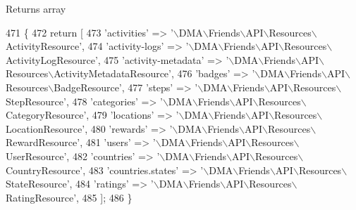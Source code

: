 \begin{DoxyReturn}{Returns}
array 
\end{DoxyReturn}

\begin{DoxyCode}
471     \{
472         \textcolor{keywordflow}{return} [
473             \textcolor{stringliteral}{'activities'}            => \textcolor{stringliteral}{'\(\backslash\)DMA\(\backslash\)Friends\(\backslash\)API\(\backslash\)Resources\(\backslash\)ActivityResource'},
474             \textcolor{stringliteral}{'activity-logs'}         => \textcolor{stringliteral}{'\(\backslash\)DMA\(\backslash\)Friends\(\backslash\)API\(\backslash\)Resources\(\backslash\)ActivityLogResource'},
475             \textcolor{stringliteral}{'activity-metadata'}     => \textcolor{stringliteral}{'\(\backslash\)DMA\(\backslash\)Friends\(\backslash\)API\(\backslash\)Resources\(\backslash\)ActivityMetadataResource'},
476             \textcolor{stringliteral}{'badges'}                => \textcolor{stringliteral}{'\(\backslash\)DMA\(\backslash\)Friends\(\backslash\)API\(\backslash\)Resources\(\backslash\)BadgeResource'},
477             \textcolor{stringliteral}{'steps'}                 => \textcolor{stringliteral}{'\(\backslash\)DMA\(\backslash\)Friends\(\backslash\)API\(\backslash\)Resources\(\backslash\)StepResource'},
478             \textcolor{stringliteral}{'categories'}            => \textcolor{stringliteral}{'\(\backslash\)DMA\(\backslash\)Friends\(\backslash\)API\(\backslash\)Resources\(\backslash\)CategoryResource'},
479             \textcolor{stringliteral}{'locations'}             => \textcolor{stringliteral}{'\(\backslash\)DMA\(\backslash\)Friends\(\backslash\)API\(\backslash\)Resources\(\backslash\)LocationResource'},
480             \textcolor{stringliteral}{'rewards'}               => \textcolor{stringliteral}{'\(\backslash\)DMA\(\backslash\)Friends\(\backslash\)API\(\backslash\)Resources\(\backslash\)RewardResource'},
481             \textcolor{stringliteral}{'users'}                 => \textcolor{stringliteral}{'\(\backslash\)DMA\(\backslash\)Friends\(\backslash\)API\(\backslash\)Resources\(\backslash\)UserResource'},
482             \textcolor{stringliteral}{'countries'}             => \textcolor{stringliteral}{'\(\backslash\)DMA\(\backslash\)Friends\(\backslash\)API\(\backslash\)Resources\(\backslash\)CountryResource'},   
483             \textcolor{stringliteral}{'countries.states'}      => \textcolor{stringliteral}{'\(\backslash\)DMA\(\backslash\)Friends\(\backslash\)API\(\backslash\)Resources\(\backslash\)StateResource'},
484             \textcolor{stringliteral}{'ratings'}               => \textcolor{stringliteral}{'\(\backslash\)DMA\(\backslash\)Friends\(\backslash\)API\(\backslash\)Resources\(\backslash\)RatingResource'},
485         ];
486     \}
\end{DoxyCode}
\hypertarget{classDMA_1_1Friends_1_1Plugin_aee1fcfd6978df90e396e75223e24080a}{}
